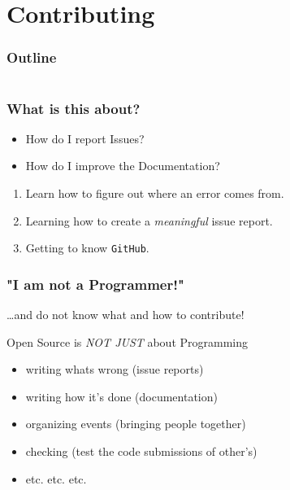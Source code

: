 \section{Contributing}

\begin{frame}
	\frametitle{Outline}
	\begin{columns}[t]
		\begin{column}{.5\textwidth}
			\tableofcontents[sections={1-9},currentsection]
		\end{column}
		\begin{column}{.5\textwidth}
			\tableofcontents[sections={10-18},currentsection]
		\end{column}
	\end{columns}
\end{frame}

\begin{frame}
	\frametitle{What is this about?}
	\begin{question}[Questions]
		\begin{itemize}
			\item How do I report Issues?
			\item How do I improve the Documentation?
		\end{itemize}
	\end{question}
	\begin{docs}[Objectives]
		\begin{enumerate}
			\item Learn how to figure out where an error comes from.
			\item Learning how to create a \emph{meaningful} issue report.
			\item Getting to know \texttt{GitHub}.
		\end{enumerate}
	\end{docs}
\end{frame}

\begin{frame}
  \frametitle{"I am not a Programmer!"}
  \ldots and do not know what and how to contribute!
  \pause
  \begin{block}{Open Source is \emph{NOT JUST} about Programming}
  	\begin{itemize}[<+->]
  		\item writing whats wrong (issue reports)
  		\item writing how it's done (documentation)
  		\item organizing events (bringing people together)
  		\item checking (test the code submissions of other's)
  		\item etc. etc. etc.
  	\end{itemize}
  \end{block} 
\end{frame}

